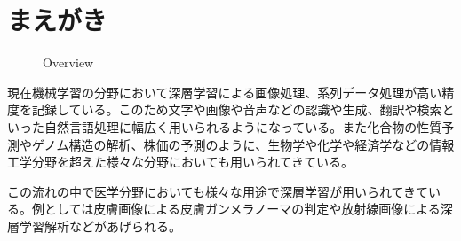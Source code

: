 \section{まえがき}

\begin{figure}[b]
    \centering
         \quad
         \quad
    \captionsetup{format=plain,font=normalsize,margin=30pt,name=図}
    \caption[]{Overview}
    \label{fig:overview}
\end{figure}

現在機械学習の分野において深層学習による画像処理\cite{CNN,AlexNet,VGG,ResNet}、系列データ処理\cite{RNN,GRU,LSTM,Transformer}が高い精度を記録している。このため文字や画像や音声などの認識\cite{DL_LVCSR,ImageNet}や生成\cite{GAN,VAE}、翻訳\cite{Transformer,Seq2Seq,effective_attention}や検索\cite{anxious_learning}といった自然言語処理に幅広く用いられるようになっている。また化合物の性質予測\cite{Chemistry1,Chemistry2}やゲノム構造の解析\cite{Genomics}、株価の予測\cite{stock_prediction}のように、生物学や化学や経済学などの情報工学分野を超えた様々な分野においても用いられてきている。

この流れの中で医学分野においても様々な用途で深層学習が用いられてきている。例としては皮膚画像による皮膚ガンメラノーマの判定\cite{skin_cancer_melanoma}や放射線画像による深層学習解析\cite{radiology}などがあげられる。

